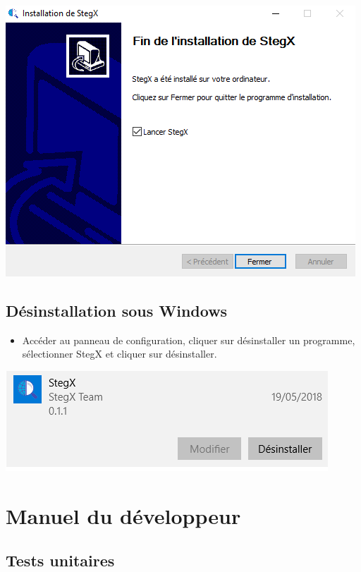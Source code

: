 \documentclass[11pt]{article}
\begin{document}
\hspace{1cm}
\includegraphics[scale=1]{pictures/fin.png}
\vspace{1cm}

\subsection{Désinstallation sous Windows}

\begin{itemize}
\item Accéder au panneau de configuration, cliquer sur désinstaller un programme,
sélectionner StegX et cliquer sur désinstaller.
\end{itemize}

\hspace{3cm}
\includegraphics[scale=0.6]{pictures/desinstall.png}
\vspace{1cm}

\section{Manuel du développeur}

\subsection{Tests unitaires}
\end{document}
